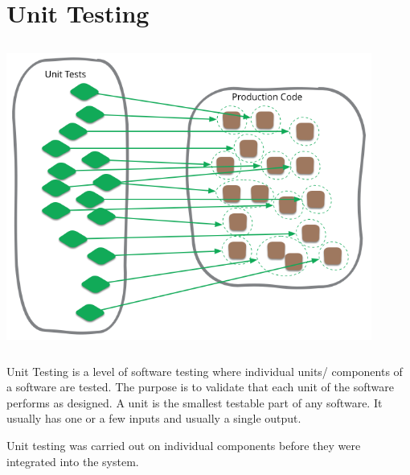 \section{Unit Testing}
\begin{center}
    \includegraphics[width=12cm,height=10cm,keepaspectratio]{images/unit}
\end{center}
Unit Testing is a level of software testing where individual units/ components
of a software are tested. The purpose is to validate that each unit of the
software performs as designed. A unit is the smallest testable part of any 
software. It usually has one or a few inputs and usually a single output.
\par
\bigskip
Unit testing was carried out on individual components before they were integrated into the system.


